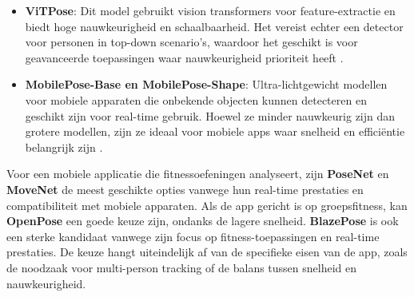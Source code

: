 \begin{itemize}
    \item \textbf{ViTPose}: Dit model gebruikt vision transformers voor feature-extractie en biedt hoge nauwkeurigheid en schaalbaarheid. Het vereist echter een detector voor personen in top-down scenario’s, waardoor het geschikt is voor geavanceerde toepassingen waar nauwkeurigheid prioriteit heeft \autocite{XuEtAl2022}.

    \item \textbf{MobilePose-Base en MobilePose-Shape}: Ultra-lichtgewicht modellen voor mobiele apparaten die onbekende objecten kunnen detecteren en geschikt zijn voor real-time gebruik. Hoewel ze minder nauwkeurig zijn dan grotere modellen, zijn ze ideaal voor mobiele apps waar snelheid en efficiëntie belangrijk zijn \autocite{HouEtAl2020}.
\end{itemize}

Voor een mobiele applicatie die fitnessoefeningen analyseert, zijn \textbf{PoseNet} en \textbf{MoveNet} de meest geschikte opties vanwege hun real-time prestaties en compatibiliteit met mobiele apparaten. 
Als de app gericht is op groepsfitness, kan \textbf{OpenPose} een goede keuze zijn, ondanks de lagere snelheid. 
\textbf{BlazePose} is ook een sterke kandidaat vanwege zijn focus op fitness-toepassingen en real-time prestaties. 
De keuze hangt uiteindelijk af van de specifieke eisen van de app, zoals de noodzaak voor multi-person tracking of de balans tussen snelheid en nauwkeurigheid.